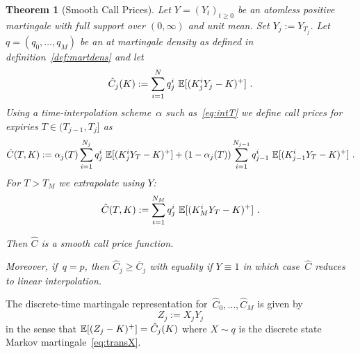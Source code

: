 \documentclass[twoside]{article}
\theoremstyle{plain}
\newtheorem{theorem}{Theorem}[section]        %
\theoremstyle{definition}
\theoremstyle{remark}
\begin{document}
\begin{theorem}[Smooth Call Prices]\label{th:simplersmooth}
    Let $Y=(Y_t)_{t\geq 0}$ be an atomless positive martingale with full support over
    $(0,\infty)$ and unit mean.
    Set $Y_j:=Y_{T_j}$.
    Let $q=(q_0,\ldots,q_M)$ be an at martingale density as defined in definition~\ref{def:martdens} 
    and let
    \begin{equation}\label{eq:CasSumC}
        \hat C_j(K) := \sum_{i=1}^{N} q_j^i\ \E[ ( K^i_j Y_j - K )^+ ] \ .        
    \end{equation}
    Using a time-interpolation scheme~$\alpha$ such as~\eqref{eq:intT} we define call prices for expiries $T\in(T_{j-1},T_j]$
    as
    \begin{equation}\label{eq:alpha_prod}
        \hat C(T,K) := \alpha_j(T) \sum_{i=1}^{N_j} q_j^i\ \mathbb{E}[ ( K^i_j Y_T - K )^+ ] + (1-\alpha_j(T)) \sum_{i=1}^{N_{j-1}} q_{j-1}^i\ \mathbb{E}[ ( K^i_{j-1} Y_T - K )^+ ] \ .
    \end{equation}
    For $T>T_M$ we extrapolate using $Y$:
    \begin{equation}\label{eq:extra}
        \hat C(T,K) := \sum_{i=1}^{N_M} q_j^i\ \mathbb{E}[ ( K^i_M Y_T - K )^+ ]  \ .
    \end{equation}

    
    Then $\hat C$ is a smooth call price function.
    
    Moreover, if~$q=p$, then $\hat C_j \geq \bar C_j$ with equality if $Y\equiv 1$ in which
    case~$\hat C$ 
        reduces to linear interpolation.
\end{theorem}

\noindent
The discrete-time martingale representation for~$\hat C_0,\ldots,\hat C_M$ is given by
\begin{equation}\label{eq:Zmart}
    Z_j := X_j Y_j     
\end{equation}
in the sense that $\mathbb{E}[ (Z_j-K)^+] = \hat C_j(K)$
where $X\sim q$ is the discrete state Markov martingale~\eqref{eq:transX}.
\end{document}
